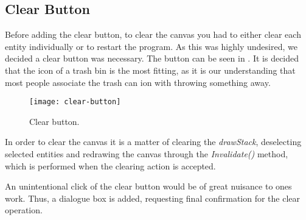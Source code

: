 \subsection{Clear Button}
Before adding the clear button, to clear the canvas you had to either clear each entity individually or to restart the program. 
As this was highly undesired, we decided a clear button was necessary.
The button can be seen in . 
It is decided that the icon of a trash bin is the most fitting, as it is our understanding that most people associate the trash can ion with throwing something away.

\begin{figure}[h]
     \centering
     \texttt{[image: clear-button]}
     \caption{Clear button.}
     \label{fig:clear-button}
\end{figure}

In order to clear the canvas it is a matter of clearing the \textit{drawStack}, deselecting selected entities and redrawing the canvas through the \textit{Invalidate()} method, which is performed when the clearing action is accepted.

An unintentional click of the clear button would be of great nuisance to ones work. 
Thus, a dialogue box is added, requesting final confirmation for the clear operation.


